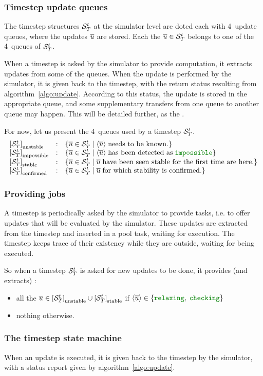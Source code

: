 \subsubsection{Timestep update queues}

The timestep structures ${{\cal S}}_{T}^{t}$ at the simulator level are doted each with 4~update queues, where the updates $\overline{u}$ are stored. Each the ${\overline{u}} \in {{{\cal S}}_{T}^{t}}$ belongs to one of the 4~queues of ${{\cal S}}_{T}^{t}$.

When a timestep is asked by the simulator to provide computation, it extracts updates from some of the queues. When the update is performed by the simulator, it is given back to the timestep, with the return status resulting from algorithm~\ref{algo:update}. According to this status, the update is stored in the appropriate queue, and some supplementary transfers from one queue to another queue may happen. This will be detailed further, as the .

For now, let us present the 4~queues used by a timestep ${{\cal S}}_{T}^{t}$.
\begin{equation}
  \cxQDefs \nonumber
\end{equation}


\subsubsection{Providing jobs \label{sec:providejobs}}

A timestep is periodically asked by the simulator to provide tasks, i.e. to offer updates that will be evaluated by the simulator. These updates are extracted from the timestep and inserted in a pool task, waiting for execution. The timestep keeps trace of their existency while they are outside, waiting for being executed.

So when a timestep ${{\cal S}}_{T}^{t}$ is asked for new updates to be done, it provides (and extracts) :
\begin{itemize}
\item all the ${\overline{u}} \in {{{\left[ {{\cal S}}_{T}^{t} \right]}_{\mathrm{unstable}}} \cup {{\left[ {{\cal S}}_{T}^{t} \right]}_{\mathrm{stable}}}}$ if $\cxJobsB$
\item nothing otherwise.
\end{itemize}


\subsubsection{The timestep state machine}

When an update is executed, it is given back to the timestep by the simulator, with a status report given by algorithm~\ref{algo:update}.

